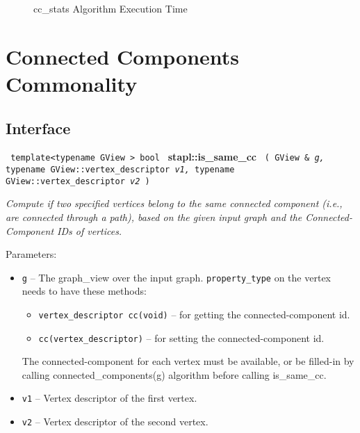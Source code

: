 \begin{figure}[p]
\caption{cc\_stats Algorithm Execution Time}
\label{fig:cc-stats-alg-exec-exper}
\end{figure}


\section{ Connected Components Commonality}
\label{sec-is-same-cc-alg}

\subsection{Interface} \label{sec-is-same-cc-alg-inter}

\noindent
\texttt{%
template<typename GView >
\newline
bool 
}
\newline
\textbf{stapl::is\_same\_cc}%
\newline
\texttt{%
(
GView \&
\textit{g,}%
typename GView::vertex\_descriptor
\textit{v1,}%
typename GView::vertex\_descriptor
\textit{v2}%
)     
}
\vspace{0.4cm}

\textit{
Compute if two specified vertices belong to the same connected component (i.e., are connected through a path), based on the given input graph and the Connected-Component IDs of vertices.
}
\vspace{0.4cm}

Parameters:
\begin{itemize}
\item
\texttt{g} --
The graph\_view over the input graph. 
\texttt{property\_type}%
on the vertex needs to have these methods: 
\begin{itemize}
\item
\texttt{vertex\_descriptor cc(void)} --
 for getting the connected-component id. 
\item
\texttt{cc(vertex\_descriptor)} --
 for setting the connected-component id. 
\end{itemize}
The connected-component for each vertex must be available, or be filled-in by calling connected\_components(g) algorithm before calling is\_same\_cc.
\item
\texttt{v1} --
Vertex descriptor of the first vertex.
\item
\texttt{v2} --
Vertex descriptor of the second vertex.
\end{itemize}

